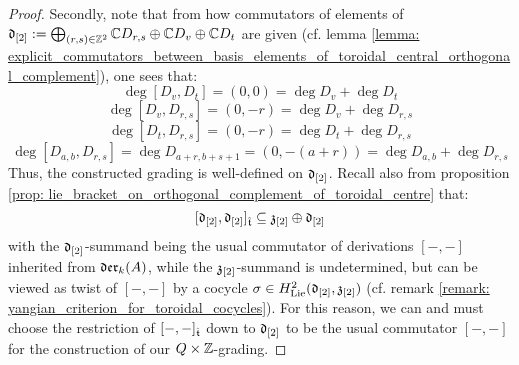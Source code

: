\begin{proof}
                Secondly, note that from how commutators of elements of $\mathfrak{d}_{[2]} := \bigoplus_{(r, s) \in \mathbb{Z}^2} \mathbb{C} D_{r, s} \oplus \mathbb{C} D_v \oplus \mathbb{C} D_t$ are given (cf. lemma \ref{lemma: explicit_commutators_between_basis_elements_of_toroidal_central_orthogonal_complement}), one sees that:
                    $$\deg [D_v, D_t] = (0, 0) = \deg D_v + \deg D_t$$
                    $$\deg [D_v, D_{r, s}] = (0, -r) = \deg D_v + \deg D_{r, s}$$
                    $$\deg [D_t, D_{r, s}] = (0, -r) = \deg D_t + \deg D_{r, s}$$
                    $$\deg [D_{a, b}, D_{r, s}] = \deg D_{a + r, b + s + 1} = (0, -(a + r)) = \deg D_{a, b} + \deg D_{r, s}$$
                Thus, the constructed grading is well-defined on $\mathfrak{d}_{[2]}$. Recall also from proposition \ref{prop: lie_bracket_on_orthogonal_complement_of_toroidal_centre} that:
                    $$[\mathfrak{d}_{[2]}, \mathfrak{d}_{[2]}]_{\hat{\mathfrak{t}}} \subseteq \mathfrak{z}_{[2]} \oplus \mathfrak{d}_{[2]}$$
                with the $\mathfrak{d}_{[2]}$-summand being the usual commutator of derivations $[-, -]$ inherited from $\mathfrak{der}_{k}(A)$, while the $\mathfrak{z}_{[2]}$-summand is undetermined, but can be viewed as twist of $[-, -]$ by a cocycle $\sigma \in H^2_{\mathrm{Lie}}(\mathfrak{d}_{[2]}, \mathfrak{z}_{[2]})$ (cf. remark \ref{remark: yangian_criterion_for_toroidal_cocycles}). For this reason, we can and must choose the restriction of $[-, -]_{\hat{\mathfrak{t}}}$ down to $\mathfrak{d}_{[2]}$ to be the usual commutator $[-, -]$ for the construction of our $Q \x \Z$-grading. 
            \end{proof}


